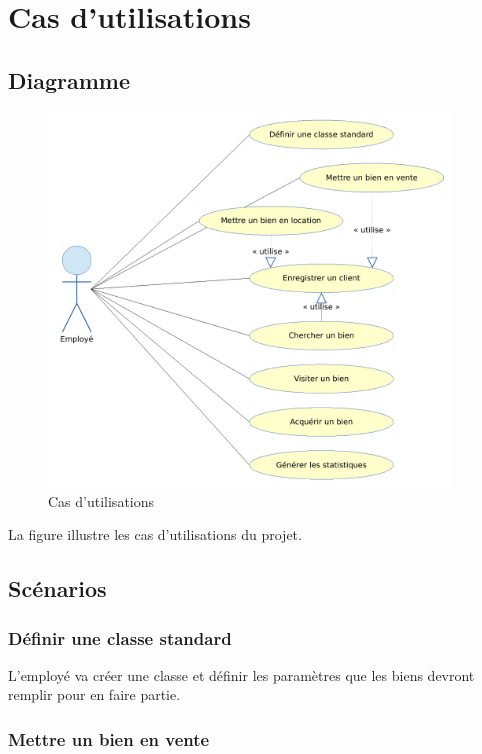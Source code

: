 \chapter{Cas d'utilisations}

\section{Diagramme}

\begin{figure}
  \centering
  \includegraphics[width=0.95\textwidth]{IMG/uc}
  \caption{Cas d'utilisations}
  \label{img_uc}
\end{figure}

La figure  illustre les cas d'utilisations du projet.

\section{Scénarios}

\subsection{Définir une classe standard}

L'employé va créer une classe et définir les paramètres que les biens devront remplir pour en faire partie.

\subsection{Mettre un bien en vente}

